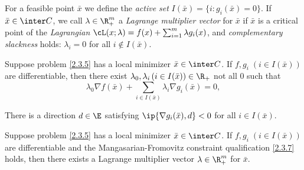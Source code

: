 \documentclass[../borwein-lewis_notes.tex]{subfiles}
\begin{document}
For a feasible point $\bar x$ we define the \textit{active set} 
$I(\bar x) = \{i:g_i(\bar x)=0\}$. If $\bar x\in\inter C$, we call 
$\lambda\in\R_+^m$ a \textit{Lagrange multiplier vector} for $\bar x$ 
if $\bar x$ is a critical point of the \textit{Lagrangian} 
$\cL(x;\lambda) = f(x) + \sum_{i=1}^m \lambda g_i(x)$, and 
\textit{complementary slackness} holds: $\lambda_i=0$ for all $i\notin
I(\bar x)$.
\begin{theorem}
Suppose problem \eqref{2.3.5} has a local minimizer $\bar x\in \inter C$.
If $f, g_i\; (i\in I(\bar x))$ are differentiable, 
then there exist $\lambda_0,\lambda_i\, (i\in I(\bar x)) \in\R_+$
 not all 0
such that 
\begin{equation*}
\lambda_0\nabla f(\bar x) + \sum_{i\in I(\bar x)}
\lambda_i \nabla g_i(\bar x)= 0,
\end{equation*}
\label{2.3.6}
\end{theorem}
\begin{assumption}
There is a direction $d\in \E$ satisfying $\ip{\nabla g_i(\bar x), d}< 0$ 
for all $i\in I(\bar x)$.
\label{2.3.7}
\end{assumption}
\begin{theorem}
Suppose problem \eqref{2.3.5} has a local minimizer $\bar x\in\inter C$. 
If $f, g_i\; (i\in I(\bar x))$ are differentiable and 
 the Mangasarian-Fromovitz constraint qualification \eqref{2.3.7} holds,
 then there exists a Lagrange multiplier vector $\lambda\in\R_+^m$ for 
$\bar x$.
\label{2.3.8}
\end{theorem}
\end{document}
